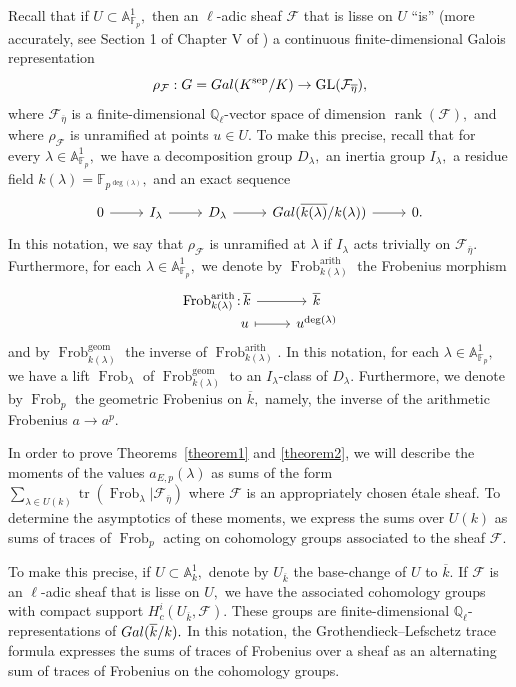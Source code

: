 \documentclass[12pt]{amsart}
\theoremstyle{definition}
\theoremstyle{remark}
\numberwithin{equation}{section}
\def\A{\mathbb A}
\def\Gal{{\rm Gal}}
\def\F{{\mathbb F}}
\def\Q{{\mathbb Q}}
\def\Q{\mathbb{Q}}
\def\F{\mathbb{F}}
\DeclareMathOperator{\Frob}{Frob}
\DeclareMathOperator{\tr}{tr}
\DeclareMathOperator{\rank}{rank}
\DeclareMathOperator{\geom}{geom}
\DeclareMathOperator{\arith}{arith}
\DeclareMathOperator{\GL}{GL}
\DeclareMathOperator{\sep}{sep}
\begin{document}
Recall that if $U\subset\A_{\F_p}^1,$ then an $\ell$-adic sheaf $\mathcal{F}$ that is lisse on $U$ ``is'' (more accurately, see Section 1 of Chapter V of \cite{ECMilneBook}) a continuous finite-dimensional Galois representation
$$
\rho_{\mathcal{F}}:G = \Gal(K^{\sep}/K)\to\GL(\mathcal{F}_{\overline{\eta}}),
$$
where $\mathcal{F}_{\overline{\eta}}$ is a finite-dimensional $\Q_\ell$-vector space of dimension $\rank(\mathcal{F}),$ and where $\rho_{\mathcal{F}}$ is unramified at points $u\in U.$ To make this precise, recall that for every $\lambda\in\A_{\F_p}^1,$ we have a decomposition group $D_\lambda,$ an inertia group $I_\lambda,$ a residue field $k(\lambda) = \F_{p^{\deg(\lambda)}},$ and an exact sequence
\begin{equation}\label{DIExactSequence}
\begin{tikzcd}
0 \arrow[r] & I_\lambda \arrow[r] & D_\lambda \arrow[r] & \Gal(\overline{k(\lambda)}/k(\lambda)) \arrow[r] & 0.
\end{tikzcd}
\end{equation}
In this notation, we say that $\rho_{\mathcal{F}}$ is unramified at $\lambda$ if $I_\lambda$ acts trivially on $\mathcal{F}_{\overline{\eta}}.$ Furthermore, for each $\lambda\in\A_{\F_p}^1,$ we denote by $\Frob_{k(\lambda)}^{\arith}$ the Frobenius morphism
$$
\begin{tikzcd}[row sep=-4pt, column sep= normal]
 \Frob_{k(\lambda)}^{\arith}\colon\!  \overline{k} \arrow[r] & \overline{k} \\
\ \ \ \ \ \ \ \ \ \quad u \arrow[r, maps to] & u^{\deg(\lambda)}       
\end{tikzcd}
$$
and by $\Frob_{k(\lambda)}^{\geom}$ the inverse of $\Frob_{k(\lambda)}^{\arith}.$ In this notation, for each $\lambda\in\A_{\F_p}^1,$ we have a lift $\Frob_\lambda$ of $\Frob_{k(\lambda)}^{\geom}$ to an $I_\lambda$-class of $D_\lambda.$ Furthermore, we denote by $\Frob_p$ the geometric Frobenius on $\overline{k},$ namely, the inverse of the arithmetic Frobenius $a\to a^p.$

In order to prove Theorems~\ref{theorem1} and \ref{theorem2}, we will describe the moments of the values $a_{E,p}(\lambda)$ as sums of the form $\sum\limits_{\lambda\in U(k)}\tr(\Frob_\lambda|\mathcal{F}_{\overline{\eta}})$ where $\mathcal{F}$ is an appropriately chosen \'etale sheaf. To determine the asymptotics of these moments, we express the sums over $U(k)$ as sums of traces of $\Frob_p$ acting on cohomology groups associated to the sheaf $\mathcal{F}.$ 

To make this precise, if $U\subset\A_{k}^1,$ denote by $U_{\overline{k}}$ the base-change of $U$ to $\overline{k}.$ If $\mathcal{F}$ is an $\ell$-adic sheaf that is lisse on $U,$ we have the associated cohomology groups with compact support $H_c^i(U_{\overline{k}},\mathcal{F}).$ These groups are finite-dimensional $\Q_\ell$-representations of $\Gal(\overline{k}/k).$ In this notation, the Grothendieck--Lefschetz trace formula expresses the sums of traces of Frobenius over a sheaf as an alternating sum of traces of Frobenius on the cohomology groups.
\end{document}
